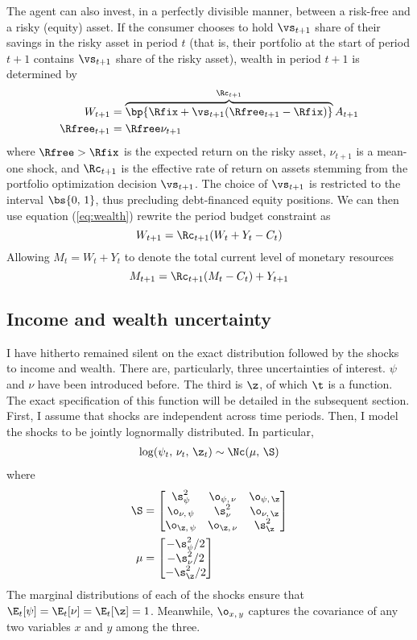 The agent can also invest, in a perfectly divisible manner, between a risk-free and a risky (equity) asset. If the consumer chooses to hold $\vs_{t+1}$ share of their savings in the risky asset in period $t$ (that is, their portfolio at the start of period $t+1$ contains $\vs_{t+1}$ share of the risky asset), wealth in period $t+1$ is determined by
\begin{align}
    W_{t+1} &= \overbrace{\bp{\Rfix + \vs_{t+1}(\Rfree_{t+1} - \Rfix)}}^{\Rc_{t+1}}A_{t+1} \label{eq:wealth}\\
    \Rfree_{t+1} &= \Rfree \nu_{t+1} \label{eq:return}
\end{align}
where $\Rfree > \Rfix$ is the expected return on the risky asset, $\nu_{t+1}$ is a mean-one shock, and $\Rc_{t+1}$ is the effective rate of return on assets stemming from the portfolio optimization decision $\vs_{t+1}$. The choice of $\vs_{t+1}$ is restricted to the interval $\bs{0,\,1}$, thus precluding debt-financed equity positions. We can then use equation (\ref{eq:wealth}) rewrite the period budget constraint as
\[
W_{t+1} = \Rc_{t+1}(W_{t} + Y_{t} - C_{t})
\]
Allowing $M_t = W_t + Y_t$ to denote the total current level of monetary resources
\[
M_{t+1} = \Rc_{t+1}(M_t - C_t) + Y_{t+1}
\]

\subsection{Income and wealth uncertainty}

I have hitherto remained silent on the exact distribution followed by the shocks to income and wealth. There are, particularly, three uncertainties of interest. $\psi$ and $\nu$ have been introduced before. The third is $\z$, of which $\t$ is a function. The exact specification of this function will be detailed in the subsequent section. First, I assume that shocks are independent across time periods. Then, I model the shocks to be jointly lognormally distributed. In particular,
\begin{align*}
    \log (\psi_t,\,\nu_t,\,\z_t) \sim \Nc(\mu,\,\S)
\end{align*}
where
\begin{align*}
    \S &= \begin{bmatrix}
        \s_{\psi}^2 & \o_{\psi,\,\nu} & \o_{\psi,\,\z}\\
        \o_{\nu,\,\psi} & \s_{\nu}^2 & \o_{\nu,\,\z}\\
        \o_{\z,\,\psi} & \o_{\z,\,\nu} & \s_{\z}^2
    \end{bmatrix}\\
    \mu &= \begin{bmatrix}
        -\s_{\psi}^2 / 2\\
        -\s_{\nu}^2 / 2\\
        -\s_{\z}^2 / 2
    \end{bmatrix}
\end{align*}
The marginal distributions of each of the shocks ensure that $\E_t[\psi] = \E_t[\nu] = \E_t[\z] = 1$. Meanwhile, $\o_{x,\,y}$ captures the covariance of any two variables $x$ and $y$ among the three.

